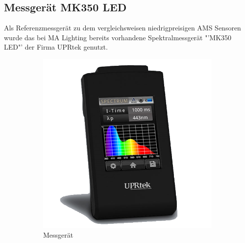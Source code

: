 \documentclass[11pt]{scrartcl}
\begin{document}
\subsection{Messgerät MK350 LED}
Als Referenzmessgerät zu dem vergleichsweisen niedrigpreisigen AMS Sensoren wurde das bei MA Lighting bereits vorhandene Spektralmessgerät
"'MK350 LED"' der Firma UPRtek genutzt.\\
\begin{figure}[H]
    \centering
    \begin{subfigure}[b]{0.49\textwidth}
        \includegraphics[width=\textwidth]{images/MK350N_Basic_Handheld_Spectrometer.png}
        \caption{Messgerät \cite{uprtek}}
    \end{subfigure}
    \hfill 
    \begin{subfigure}[b]{0.49\textwidth}

\end{subfigure}
\end{figure}
\end{document}
